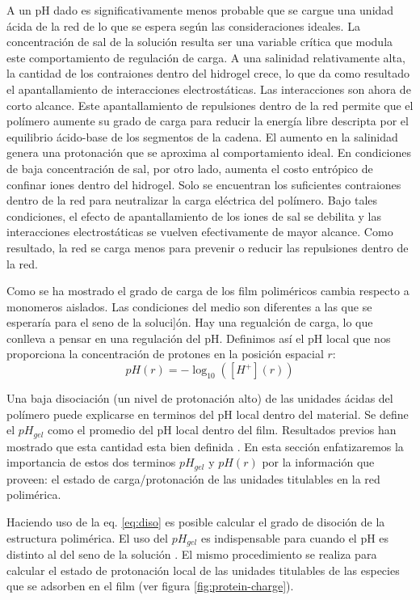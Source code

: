 A un pH dado es significativamente menos probable que se cargue una unidad \'acida de la red de lo que se espera seg\'un las consideraciones ideales. La concentraci\'on de sal de la soluci\'on resulta ser una variable cr\'itica que modula este comportamiento de regulación de carga. A una salinidad relativamente alta, la cantidad de los contraiones dentro del hidrogel crece, lo que da como resultado el apantallamiento de interacciones electrost\'aticas. Las interacciones son ahora de corto alcance. Este apantallamiento de repulsiones dentro de la red permite que el pol\'imero aumente su grado de carga para reducir la energ\'ia libre descripta por el equilibrio \'acido-base de los segmentos de la cadena. El aumento en la salinidad genera una protonaci\'on que se aproxima al comportamiento ideal. En condiciones de baja concentraci\'on de sal, por otro lado, aumenta el costo entr\'opico de confinar iones dentro del hidrogel. Solo se encuentran los suficientes contraiones dentro de la red para neutralizar la carga el\'ectrica del pol\'imero. Bajo tales condiciones, el efecto de apantallamiento de los iones de sal se debilita y las interacciones electrost\'aticas se vuelven efectivamente de mayor alcance. Como resultado, la red se carga menos para prevenir o reducir las repulsiones dentro de la red.

Como se ha mostrado el grado de carga de los film polim\'ericos cambia respecto a monomeros aislados. Las condiciones del medio son diferentes a las que se esperar\'ia para el seno de la soluci]\'on. Hay una regualci\'on de carga, lo que conlleva a pensar en una regulaci\'on del pH.
Definimos as\'i el pH local que nos proporciona la concentraci\'on de protones  en la posición espacial $r$:
\begin{equation}
    pH(r) = -\log_{10}([H^+](r))
    \label{eq:pH-local}
\end{equation}

Una baja disociaci\'on (un nivel de protonaci\'on alto) de las unidades \'acidas del pol\'imero puede explicarse en terminos del pH local dentro del material. Se define el $pH_{gel}$ como el promedio del pH local dentro del film. Resultados previos han mostrado que esta cantidad esta bien definida \addcite. En esta secci\'on enfatizaremos la importancia de estos dos terminos $pH_{gel}$ y $pH(r)$ por la informaci\'on que proveen: el estado de carga/protonaci\'on de las unidades titulables en la red polim\'erica. 

Haciendo uso de la eq. \ref{eq:diso} es posible calcular el grado de disoci\'on de la estructura polim\'erica. El uso del $pH_{gel}$ es indispensable para cuando el pH es distinto al  del seno de la soluci\'on \addcite. El mismo procedimiento se realiza para calcular el estado de protonaci\'on local de las unidades titulables de las especies que se adsorben en el film (ver figura \ref{fig:protein-charge}).

